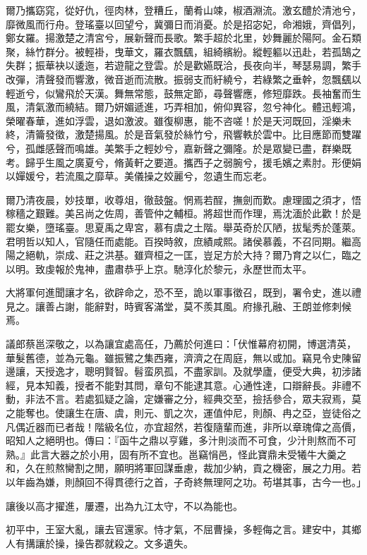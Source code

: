 \begin{pinyinscope}
爾乃攜窈窕，從好仇，徑肉林，登糟丘，蘭肴山竦，椒酒淵流。激玄醴於清池兮，靡微風而行舟。登瑤臺以回望兮，冀彌日而消憂。於是招宓妃，命湘娥，齊倡列，鄭女羅。揚激楚之清宮兮，展新聲而長歌。繁手超於北里，妙舞麗於陽阿。金石類聚，絲竹群分。被輕褂，曳華文，羅衣飄颻，組綺繽紛。縱輕軀以迅赴，若孤鵠之失群；振華袂以逶迤，若遊龍之登雲。於是歡嬿既洽，長夜向半，琴瑟易調，繁手改彈，清聲發而響激，微音逝而流散。振弱支而紆繞兮，若綠繁之垂幹，忽飄颻以輕逝兮，似鸞飛於天漢。舞無常態，鼓無定節，尋聲響應，修短靡跌。長袖奮而生風，清氣激而繞結。爾乃妍媚遞進，巧弄相加，俯仰異容，忽兮神化。體迅輕鴻，榮曜春華，進如浮雲，退如激波。雖復柳惠，能不咨嗟！於是天河既回，淫樂未終，清籥發徵，激楚揚風。於是音氣發於絲竹兮，飛響軼於雲中。比目應節而雙躍兮，孤雌感聲而鳴雄。美繁手之輕妙兮，嘉新聲之彌隆。於是眾變已盡，群樂既考。歸乎生風之廣夏兮，脩黃軒之要道。攜西子之弱腕兮，援毛嬪之素肘。形便娟以嬋媛兮，若流風之靡草。美儀操之姣麗兮，忽遺生而忘老。

爾乃清夜晨，妙技單，收尊俎，徹鼓盤。惘焉若酲，撫劍而歎。慮理國之須才，悟稼穡之艱難。美呂尚之佐周，善管仲之輔桓。將超世而作理，焉沈湎於此歡！於是罷女樂，墮瑤臺。思夏禹之卑宮，慕有虞之土階。舉英奇於仄陋，拔髦秀於蓬萊。君明哲以知人，官隨任而處能。百揆時敘，庶績咸熙。諸侯慕義，不召同期。繼高陽之絕軌，崇成、莊之洪基。雖齊桓之一匡，豈足方於大持？爾乃育之以仁，臨之以明。致虔報於鬼神，盡肅恭乎上京。馳淳化於黎元，永歷世而太平。

大將軍何進聞讓才名，欲辟命之，恐不至，詭以軍事徵召，既到，署令史，進以禮見之。讓善占謝，能辭對，時賓客滿堂，莫不羨其風。府掾孔融、王朗並修刺候焉。

議郎蔡邕深敬之，以為讓宜處高任，乃薦於何進曰：「伏惟幕府初開，博選清英，華髮舊德，並為元龜。雖振鷺之集西雍，濟濟之在周庭，無以或加。竊見令史陳留邊讓，天授逸才，聰明賢智。髫蛮夙孤，不盡家訓。及就學廬，便受大典，初涉諸經，見本知義，授者不能對其問，章句不能逮其意。心通性達，口辯辭長。非禮不動，非法不言。若處狐疑之論，定嫌審之分，經典交至，撿括參合，眾夫寂焉，莫之能奪也。使讓生在唐、虞，則元、凱之次，運值仲尼，則顏、冉之亞，豈徒俗之凡偶近器而已者哉！階級名位，亦宜超然，若復隨輩而進，非所以章瑰偉之高價，昭知人之絕明也。傳曰：『函牛之鼎以亨雞，多汁則淡而不可食，少汁則熬而不可熟。』此言大器之於小用，固有所不宜也。邕竊悁邑，怪此寶鼎未受犧牛大羹之和，久在煎熬臠割之閒，願明將軍回謀垂慮，裁加少納，貢之機密，展之力用。若以年齒為嫌，則顏回不得貫德行之首，子奇終無理阿之功。苟堪其事，古今一也。」

讓後以高才擢進，屢遷，出為九江太守，不以為能也。

初平中，王室大亂，讓去官還家。恃才氣，不屈曹操，多輕侮之言。建安中，其鄉人有搆讓於操，操告郡就殺之。文多遺失。


\end{pinyinscope}
